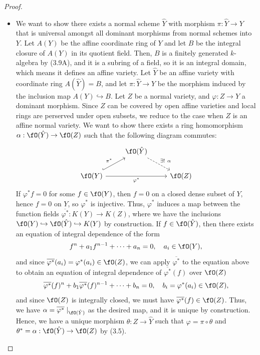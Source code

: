 \documentclass[a4paper]{article}
\begin{document}
\begin{enumerate} [label=\textbf{\arabic*.}, leftmargin=-0.05em]
\begin{proof}
\begin{itemize} [leftmargin=0cm]
    \item[(e)] We want to show there exists a normal scheme $\hat{Y}$ with morphism $\pi : \hat{Y} \to Y$ that is universal amongst all dominant morphisms from normal schemes into $Y$.
    Let $A(Y)$ be the affine coordinate ring of $Y$ and let $B$ be the integral closure of $A(Y)$ in its quotient field.
    Then, $B$ is a finitely generated $k$-algebra by (3.9A), and it is a subring of a field, so it is an integral domain, which means it defines an affine variety.
    Let $\hat{Y}$ be an affine variety with coordinate ring $A(\hat{Y}) = B$, and let $\pi : \hat{Y} \to Y$ be the morphism induced by the inclusion map $A(Y) \hookrightarrow B$.
    Let $Z$ be a normal variety, and $\varphi : Z \to Y$ a dominant morphism.
    Since $Z$ can be covered by open affine varieties and local rings are perserved under open subsets, we reduce to the case when $Z$ is an affine normal variety.
    We want to show there exists a ring homomorphism $\alpha : \fO(\hat{Y}) \to \fO(Z)$ such that the following diagram commutes:
    \[ \begin{tikzcd}
        & \fO(\hat{Y}) \arrow[rd, "\exists! ~ \alpha", dashed] &        \\
        \fO(Y) \arrow[rr, "\varphi^*"'] \arrow[ru, "\pi^*", hook] &                                                      & \fO(Z)
    \end{tikzcd} \]
    If $\varphi^*f = 0$ for some $f \in \fO(Y)$, then $f = 0$ on a closed dense subset of $Y$, hence $f = 0$ on $Y$, so $\varphi^*$ is injective.
    Thus, $\varphi^*$ induces a map between the function fields $\overline{\varphi^*} : K(Y) \to K(Z)$, where we have the inclusions $\fO(Y) \hookrightarrow \fO(\hat{Y}) \hookrightarrow K(Y)$ by construction.
    If $f \in \fO(\hat{Y})$, then there exists an equation of integral dependence of the form
    \begin{equation*}
        f^n + a_1 f^{n - 1} + \cdots +  a_n = 0, \quad a_i \in \fO(Y),
    \end{equation*}
    and since $\overline{\varphi^*}(a_i) = \varphi^*(a_i) \in \fO(Z)$, we can apply $\overline{\varphi^*}$ to the equation above to obtain an equation of integral dependence of $\overline{\varphi^*}(f)$ over $\fO(Z)$
    \begin{equation*}
        \overline{\varphi^*}(f)^n + b_1 \overline{\varphi^*}(f)^{n - 1} + \cdots + b_n = 0, \quad b_i = \varphi^*(a_i) \in \fO(Z),
    \end{equation*}
    and since $\fO(Z)$ is integrally closed, we must have $\overline{\varphi^*}(f) \in \fO(Z)$. Thus, we have $\alpha = \overline{\varphi^*} \mid_{\fO(\hat{Y})}$ as the desired map, and it is unique by construction. Hence, we have a unique morphism $\theta : Z \to \hat{Y}$ such that $\varphi = \pi \circ \theta$ and $\theta^* = \alpha : \fO(\hat{Y}) \to \fO(Z)$ by (3.5).
   \end{itemize}
\end{proof}


\end{enumerate}
\end{document}
